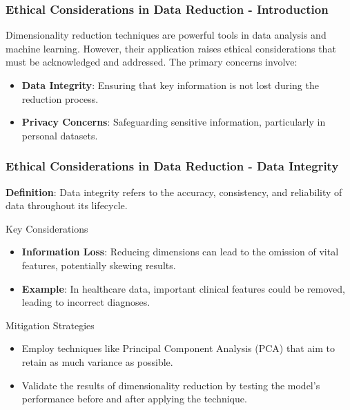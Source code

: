 \documentclass[aspectratio=169]{beamer}
\begin{document}
\begin{frame}[fragile]
    \frametitle{Ethical Considerations in Data Reduction - Introduction}
    Dimensionality reduction techniques are powerful tools in data analysis and machine learning. However, their application raises ethical considerations that must be acknowledged and addressed. The primary concerns involve:
    \begin{itemize}
        \item \textbf{Data Integrity}: Ensuring that key information is not lost during the reduction process.
        \item \textbf{Privacy Concerns}: Safeguarding sensitive information, particularly in personal datasets.
    \end{itemize}
\end{frame}

\begin{frame}[fragile]
    \frametitle{Ethical Considerations in Data Reduction - Data Integrity}
    \textbf{Definition}: Data integrity refers to the accuracy, consistency, and reliability of data throughout its lifecycle.

    \begin{block}{Key Considerations}
        \begin{itemize}
            \item \textbf{Information Loss}: Reducing dimensions can lead to the omission of vital features, potentially skewing results.
            \item \textbf{Example}: In healthcare data, important clinical features could be removed, leading to incorrect diagnoses.
        \end{itemize}
    \end{block}

    \begin{block}{Mitigation Strategies}
        \begin{itemize}
            \item Employ techniques like Principal Component Analysis (PCA) that aim to retain as much variance as possible.
            \item Validate the results of dimensionality reduction by testing the model's performance before and after applying the technique.
        \end{itemize}
    \end{block}
\end{frame}
\end{document}
